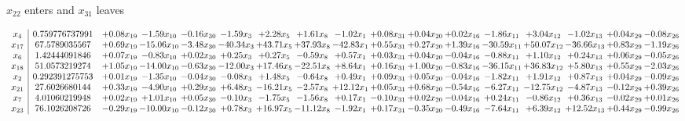 \documentclass[9pt]{article}
\begin{document}
 $ x_{22} $ enters and $ x_{31} $ leaves 

 \[\begin{array}{c| c c@{\hskip 2pt} c@{\hskip 2pt} c@{\hskip 2pt} c@{\hskip 2pt} c@{\hskip 2pt} c@{\hskip 2pt} c@{\hskip 2pt} c@{\hskip 2pt} c@{\hskip 2pt} c@{\hskip 2pt} c@{\hskip 2pt} c@{\hskip 2pt} c@{\hskip 2pt} c@{\hskip 2pt} c@{\hskip 2pt} }
 x_{4}   &  0.759776737991 & +  0.08 x_{19} & -1.59 x_{10} & -0.16 x_{30} & -1.59 x_{3} & +  2.28 x_{5} & +  1.61 x_{8} & -1.02 x_{1} & +  0.08 x_{31} & +  0.04 x_{20} & +  0.02 x_{16} & -1.86 x_{11} & +  3.04 x_{12} & -1.02 x_{13} & +  0.04 x_{29} & -0.08 x_{26}\\
 x_{17}   &  67.5789035567 & +  0.69 x_{19} & -15.06 x_{10} & -3.48 x_{30} & -40.34 x_{3} & + 43.71 x_{5} & + 37.93 x_{8} & -42.83 x_{1} & +  0.55 x_{31} & +  0.27 x_{20} & +  1.39 x_{16} & -30.59 x_{11} & + 50.07 x_{12} & -36.66 x_{13} & +  0.83 x_{29} & -1.19 x_{26}\\
 x_{6}   &  1.42444091846 & +  0.07 x_{19} & -0.83 x_{10} & +  0.02 x_{30} & +  0.25 x_{3} & +  0.27 x_{5} & -0.59 x_{8} & +  0.57 x_{1} & +  0.03 x_{31} & +  0.04 x_{20} & -0.04 x_{16} & -0.88 x_{11} & +  1.10 x_{12} & +  0.24 x_{13} & +  0.06 x_{29} & -0.05 x_{26}\\
 x_{18}   &  51.0573219274 & +  1.05 x_{19} & -14.00 x_{10} & -0.63 x_{30} & -12.00 x_{3} & + 17.46 x_{5} & -22.51 x_{8} & +  8.64 x_{1} & +  0.16 x_{31} & +  1.00 x_{20} & -0.83 x_{16} & -36.15 x_{11} & + 36.83 x_{12} & +  5.80 x_{13} & +  0.55 x_{29} & -2.03 x_{26}\\
 x_{2}   &  0.292391275753 & +  0.01 x_{19} & -1.35 x_{10} & -0.04 x_{30} & -0.08 x_{3} & +  1.48 x_{5} & -0.64 x_{8} & +  0.49 x_{1} & +  0.09 x_{31} & +  0.05 x_{20} & -0.04 x_{16} & -1.82 x_{11} & +  1.91 x_{12} & +  0.87 x_{13} & +  0.04 x_{29} & -0.09 x_{26}\\
 x_{21}   &  27.6026680144 & +  0.33 x_{19} & -4.90 x_{10} & +  0.29 x_{30} & +  6.48 x_{3} & -16.21 x_{5} & -2.57 x_{8} & + 12.12 x_{1} & +  0.05 x_{31} & +  0.68 x_{20} & -0.54 x_{16} & -6.27 x_{11} & -12.75 x_{12} & -4.87 x_{13} & -0.12 x_{29} & +  0.39 x_{26}\\
 x_{7}   &  4.01060219948 & +  0.02 x_{19} & +  1.01 x_{10} & +  0.05 x_{30} & -0.10 x_{3} & -1.75 x_{5} & -1.56 x_{8} & +  0.17 x_{1} & -0.10 x_{31} & +  0.02 x_{20} & -0.04 x_{16} & +  0.24 x_{11} & -0.86 x_{12} & +  0.36 x_{13} & -0.02 x_{29} & +  0.01 x_{26}\\
 x_{23}   &  76.1026208726 & -0.29 x_{19} & -10.00 x_{10} & -0.12 x_{30} & +  0.78 x_{3} & + 16.97 x_{5} & -11.12 x_{8} & -1.92 x_{1} & +  0.17 x_{31} & -0.35 x_{20} & -0.49 x_{16} & -7.64 x_{11} & +  6.39 x_{12} & + 12.52 x_{13} & +  0.44 x_{29} & -0.99 x_{26}\\

\end{array}\]
\end{document}
